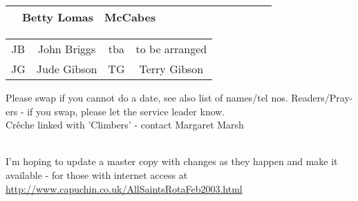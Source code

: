\documentclass[10pt,a4paper]{article}
\begin{document}
\begin{landscape}
\begin{center}
{\begin{tabular}{|l|p{2cm}|p{1.4cm}|p{1.0cm}|p{0.8cm}|p{3.4cm}|p{2cm}|p{1.5cm}|p{2cm}|p{2cm}|p{1.9cm}
|p{2cm}|p{1.8cm}|}
&  Betty Lomas &  McCabes \\
\hline
\end{tabular}
}

\begin{tabular}{|c|c|c|c|}\hline
JB & John Briggs &  tba & to be arranged  \\ %
JG  & Jude Gibson & TG & Terry Gibson 
  \\ \hline
\end{tabular}
\end{center}
\vspace{1em}
Please swap if you cannot do a date, see also list of names/tel nos.
Readers/Pray-ers - if you swap, please let the service leader know.\\
Cr\^{e}che linked with 'Climbers' - contact Margaret Marsh
{\\ \footnotesize I'm hoping to update a master copy with changes as they
happen and make it available - for those with internet access at
\url{http://www.capuchin.co.uk/AllSaintsRotaFeb2003.html} 


}
\end{landscape}
\end{document}
